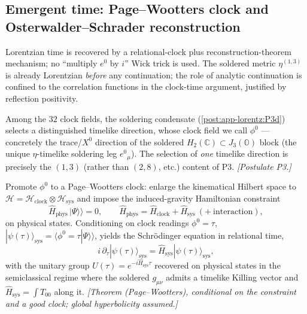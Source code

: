 \subsection{Emergent time: Page--Wootters clock and Osterwalder--Schrader reconstruction}
\label{subsec:app-lorentz:time}

Lorentzian time is recovered by a relational-clock plus reconstruction-theorem
mechanism; no ``multiply $e^{0}$ by $i$'' Wick trick is used. The soldered metric
$\eta^{(1,3)}$ is already Lorentzian \emph{before} any continuation; the role of
analytic continuation is confined to the correlation functions in the clock-time
argument, justified by reflection positivity.

\begin{postulate}
\label{post:app-lorentz:clock}
Among the $32$ clock fields, the soldering condensate
(\autoref{post:app-lorentz:P3d}) selects a distinguished timelike direction, whose
clock field we call $\phi^{0}$ --- concretely the trace/$X^{0}$ direction of the
soldered $H_{2}(\mathbb{C})\subset J_{3}(\mathbb{O})$ block (the unique
$\eta$-timelike soldering leg $e^{0}{}_{\mu}$). The selection of \emph{one} timelike
direction is precisely the $(1,3)$ (rather than $(2,8)$, etc.) content of P3.
\emph{[Postulate P3.]}
\end{postulate}

\begin{theorem}
\label{thm:app-lorentz:PW}
Promote $\phi^{0}$ to a Page--Wootters clock: enlarge the kinematical Hilbert space
to $\mathcal{H}=\mathcal{H}_{\mathrm{clock}}\otimes\mathcal{H}_{\mathrm{sys}}$ and
impose the induced-gravity Hamiltonian constraint
\begin{equation}
\label{eq:app-lorentz:constraint}
\hat{H}_{\mathrm{phys}}\,|\Psi\rangle\!\rangle=0,
\qquad
\hat{H}_{\mathrm{phys}}=\hat{H}_{\mathrm{clock}}+\hat{H}_{\mathrm{sys}}
\ (+\ \text{interaction}),
\end{equation}
on physical states. Conditioning on clock readings $\phi^{0}=\tau$,
$|\psi(\tau)\rangle_{\mathrm{sys}}=\langle\phi^{0}=\tau|\Psi\rangle\!\rangle$, yields
the Schr\"odinger equation in relational time,
\begin{equation}
\label{eq:app-lorentz:schrodinger}
i\,\partial_{\tau}|\psi(\tau)\rangle_{\mathrm{sys}}
 =\hat{H}_{\mathrm{sys}}|\psi(\tau)\rangle_{\mathrm{sys}},
\end{equation}
with the unitary group $U(\tau)=e^{-i\hat{H}_{\mathrm{sys}}\tau}$ recovered on
physical states in the semiclassical regime where the soldered $g_{\mu\nu}$ admits a
timelike Killing vector and $\hat{H}_{\mathrm{sys}}=\int T_{00}$ along it.
\emph{[Theorem (Page--Wootters), conditional on the constraint and a good clock; global hyperbolicity assumed.]}
\end{theorem}

